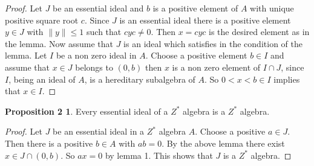 \documentclass[a4paper,10pt]{amsart}
\theoremstyle{definition}
\newtheorem*{prop2}{Proposition  2}
\theoremstyle{plain}
\begin{document}
\begin{proof}
Let $J$ be  an essential ideal and $b$ is a  positive element of $A$ with unique positive  square root $c$. Since $J$ is  an  essential ideal there is  a  positive  element $y\in J$ with $\parallel y\parallel \leq 1$ such that $cyc\neq 0$. Then $x=cyc$ is  the  desired element as in the lemma.
Now assume that  $J$ is  an ideal which  satisfies in the  condition of the lemma. Let $I$  be  a non zero ideal in $A$.
Choose  a  positive  element $b\in I$ and  assume  that $x\in J$ belongs to $(0, b)$  then $x$ is  a  non zero element of $I\cap J$, since $I$, being  an ideal of  $A$, is  a hereditary subalgebra of $A$. So $0<x<b \in I$ implies that $x\in I$.

\end{proof}
\begin{prop2}
Every  essential ideal of  a  $Z^{*}$  algebra is  a  $Z^{*}$ algebra.
\end{prop2}

\begin{proof}
Let $J$ be  an essential ideal in a  $Z^{*}$  algebra $A$. Choose  a positive $a\in J$. Then there is  a positive $b\in A$ with $ab=0$. By the  above  lemma there exist $x\in J \cap (0, b)$. So $ax=0$ by lemma 1. This  shows that $J$ is  a  $Z^{*}$  algebra.
\end{proof}
\end{document}
